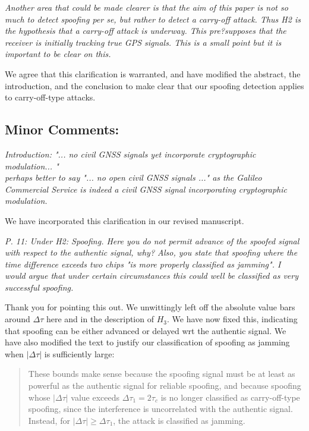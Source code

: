 \documentclass[12pt]{report}
\begin{document}
  
  
{\textit{Another area that could be made clearer is that the aim of
      this paper is not
so much to detect spoofing per se, but rather to
      detect a carry-off attack.
Thus H2 is the hypothesis that a carry-off
      attack is underway. This pre?supposes
that the receiver is initially
      tracking true GPS signals. This is a small point
but it is important to
      be clear on this.}}


 We agree that this clarification is warranted, and have modified the
  abstract, the introduction, and the conclusion to make clear that our
  spoofing detection applies to carry-off-type attacks.




\subsection*{Minor Comments:}

{\textit{Introduction: "... no civil GNSS signals yet incorporate cryptographic modulation...
" \\
      perhaps better to say "... no open civil GNSS signals ..." as the
      Galileo
Commercial Service is indeed a civil GNSS signal incorporating
      cryptographic
modulation.}}

  
  {We have incorporated this clarification in our revised manuscript.}
  


{\textit{P. 11: Under H2: Spoofing. Here you do not permit advance of the
      spoofed signal
with respect to the authentic signal, why?  Also, you
      state that spoofing where
the time difference exceeds two chips "is
      more properly classified as jamming".
I would argue that under certain
      circumstances this could well be classified
as very successful
      spoofing.}}

  
   Thank you for pointing this out.  We unwittingly left off the absolute
    value bars around $\Delta \tau$ here and in the description of $H_3$.  We
    have now fixed this, indicating that spoofing can be either advanced or
    delayed wrt the authentic signal.  We have also modified the text to
    justify our classification of spoofing as jamming when $|\Delta \tau|$ is
    sufficiently large:

    \begin{quotation}
      These bounds make sense because the spoofing signal must be at least as
      powerful as the authentic signal for reliable spoofing, and because
      spoofing whose $|\Delta \tau|$ value exceeds $\Delta \tau_1 = 2\tau_c$
      is no longer classified as carry-off-type spoofing, since the
      interference is uncorrelated with the authentic signal.  Instead, for
      $|\Delta \tau| \geq \Delta \tau_1$, the attack is classified as jamming.
    \end{quotation}
\end{document}
